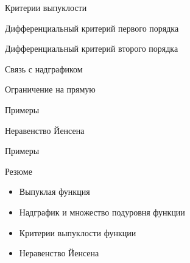 \documentclass[12pt,russian]{beamer}
\begin{document}
\begin{frame}{Критерии выпуклости}
\begin{block}{Дифференциальный критерий первого порядка}

\end{block}

\begin{block}{Дифференциальный критерий второго порядка}

\end{block}

\begin{block}{Связь с надграфиком}

\end{block}

\begin{block}{Ограничение на прямую}

\end{block}
\end{frame}

\begin{frame}{Примеры}

\end{frame}

\begin{frame}{Неравенство Йенсена} 

\end{frame}

\begin{frame}{Примеры}

\end{frame}

\begin{frame}{Резюме}
\begin{itemize}
\item Выпуклая функция
\item Надграфик и множество подуровня функции
\item Критерии выпуклости функции
\item Неравенство Йенсена
\end{itemize}
\end{frame}
\end{document}
